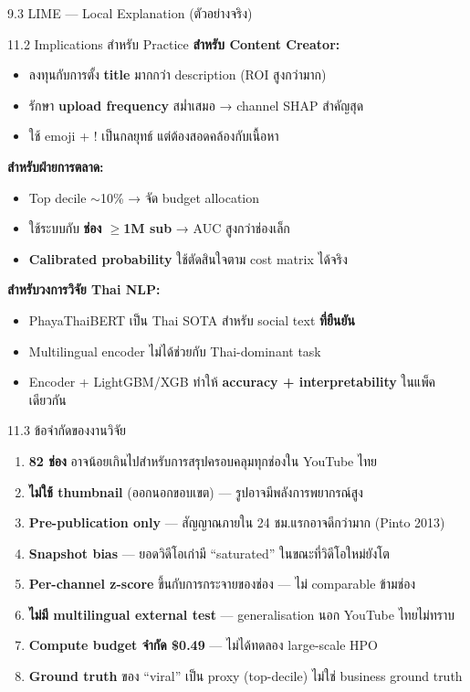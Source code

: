 \documentclass[aspectratio=169,11pt,xcolor=dvipsnames]{beamer}
\newcommand{\hl}[1]{\textcolor{kmitlOrange}{\textbf{#1}}}
\newcommand{\hlb}[1]{\textcolor{kmitlBlue}{\textbf{#1}}}
\begin{document}
\begin{frame}{9.3 LIME — Local Explanation (ตัวอย่างจริง)}
\begin{center}
\begin{frame}{11.2 Implications สำหรับ Practice}
  \textbf{สำหรับ Content Creator:}
  \begin{itemize}
    \item ลงทุนกับการตั้ง \hl{title} มากกว่า description (ROI สูงกว่ามาก)
    \item รักษา \hl{upload frequency} สม่ำเสมอ → channel SHAP สำคัญสุด
    \item ใช้ emoji + ! เป็นกลยุทธ์ แต่ต้องสอดคล้องกับเนื้อหา
  \end{itemize}
  \vspace{0.4em}
  \textbf{สำหรับฝ่ายการตลาด:}
  \begin{itemize}
    \item Top decile $\sim$10\% → จัด budget allocation
    \item ใช้ระบบกับ \hl{ช่อง $\geq$1M sub} → AUC สูงกว่าช่องเล็ก
    \item \hl{Calibrated probability} ใช้ตัดสินใจตาม cost matrix ได้จริง
  \end{itemize}
  \vspace{0.4em}
  \textbf{สำหรับวงการวิจัย Thai NLP:}
  \begin{itemize}
    \item PhayaThaiBERT เป็น Thai SOTA สำหรับ social text \hl{ที่ยืนยัน}
    \item Multilingual encoder ไม่ได้ช่วยกับ Thai-dominant task
    \item Encoder + LightGBM/XGB ทำให้ \hl{accuracy + interpretability} ในแพ็คเดียวกัน
  \end{itemize}
\end{frame}

\begin{frame}{11.3 ข้อจำกัดของงานวิจัย}
  \begin{enumerate}\setlength\itemsep{0.4em}
    \item \hlb{82 ช่อง} อาจน้อยเกินไปสำหรับการสรุปครอบคลุมทุกช่องใน YouTube ไทย
    \item \hlb{ไม่ใช้ thumbnail} (ออกนอกขอบเขต) — รูปอาจมีพลังการพยากรณ์สูง
    \item \hlb{Pre-publication only} — สัญญาณภายใน 24 ชม.แรกอาจดีกว่ามาก (Pinto 2013)
    \item \hlb{Snapshot bias} — ยอดวิดีโอเก่ามี ``saturated'' ในขณะที่วิดีโอใหม่ยังโต
    \item \hlb{Per-channel z-score} ขึ้นกับการกระจายของช่อง — ไม่ comparable ข้ามช่อง
    \item \hlb{ไม่มี multilingual external test} — generalisation นอก YouTube ไทยไม่ทราบ
    \item \hlb{Compute budget จำกัด \$0.49} — ไม่ได้ทดลอง large-scale HPO
    \item \hlb{Ground truth} ของ ``viral'' เป็น proxy (top-decile) ไม่ใช่ business ground truth
  \end{enumerate}
\end{frame}


\end{center}
\end{frame}
\end{document}
